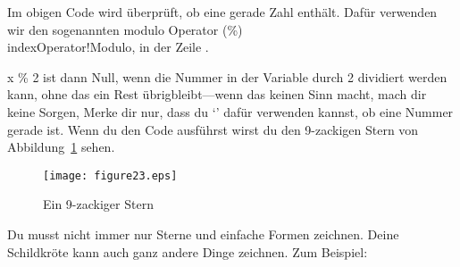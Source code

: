 Im obigen Code wird überprüft, ob  eine gerade Zahl enthält. Dafür verwenden wir den sogenannten modulo Operator (\%)\\ index{Operator!Modulo}, in der Zeile .
\par
x \% 2 ist dann Null, wenn die Nummer in der Variable  durch 2 dividiert werden kann, ohne das ein Rest übrigbleibt---wenn das keinen Sinn macht, mach dir keine Sorgen, Merke dir nur, dass du `' dafür verwenden kannst, ob eine Nummer gerade ist. Wenn du den Code ausführst wirst du den 9-zackigen Stern von Abbildung~\ref{fig23} sehen.

\begin{figure}
\begin{center}
\texttt{[image: figure23.eps]}
\end{center}
\caption{Ein 9-zackiger Stern}\label{fig23}
\end{figure}

Du musst nicht immer nur Sterne und einfache Formen zeichnen. Deine Schildkröte kann auch ganz andere Dinge zeichnen. Zum Beispiel:

